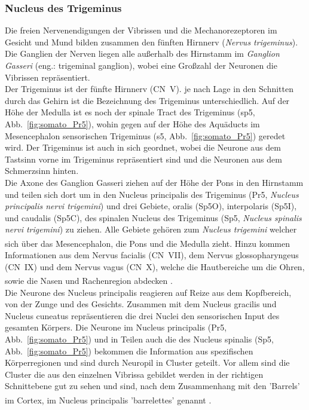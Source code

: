 \documentclass[12pt,a4paper,pdftex]{article}
\begin{document}
\subsubsection*{Nucleus des Trigeminus}
Die freien Nervenendigungen der Vibrissen und die Mechanorezeptoren im Gesicht und Mund bilden zusammen den fünften Hirnnerv (\textit{Nervus trigeminus}). Die Ganglien der Nerven liegen alle außerhalb des Hirnstamm im \textit{Ganglion Gasseri} (eng.: trigeminal ganglion), wobei eine Großzahl der Neuronen die Vibrissen repräsentiert.
\\
\noindent
Der Trigeminus ist der fünfte Hirnnerv (CN~V). je nach Lage in den Schnitten durch das Gehirn ist die Bezeichnung des Trigeminus unterschiedlich. Auf der Höhe der Medulla ist es noch der spinale Tract des Trigeminus (sp5, Abb.~\ref{fig:somato_Pr5}), wohin gegen auf der Höhe des Aquäducts im Mesencephalon sensorischen Trigeminus  (s5, Abb.~\ref{fig:somato_Pr5}) geredet wird. Der Trigeminus ist auch in sich geordnet, wobei die Neurone aus dem Tastsinn vorne im Trigeminus repräsentiert sind und die Neuronen aus dem Schmerzsinn hinten.
\\
\noindent
Die Axone des Ganglion Gasseri ziehen auf der Höhe der Pons in den Hirnstamm und teilen sich dort um in den Nucleus principalis des Trigeminus (Pr5, \textit{Nucleus principalis nervi trigemini})  und drei Gebiete, oralis (Sp5O), interpolaris (Sp5I), und caudalis (Sp5C), des spinalen Nucleus des Trigeminus (Sp5, \textit{Nucleus spinalis nervi trigemini}) zu ziehen. Alle Gebiete gehören zum \textit{Nucleus trigemini} welcher sich über das Mesencephalon, die Pons und die Medulla zieht\textsuperscript{\cite[5]{heldmaier2003tierphysiologie}}. 
Hinzu kommen Informationen aus dem Nervus facialis (CN~VII), dem Nervus glossopharyngeus  (CN~IX) und dem Nervus vagus (CN~X), welche die Hautbereiche um die Ohren, sowie die Nasen und Rachenregion abdecken
\textsuperscript{\cite[12]{neurowissenschaften_baer}}.
\\
\noindent Die Neurone des Nucleus principalis reagieren auf Reize aus dem Kopfbereich, von der Zunge und des Gesichts. Zusammen mit dem Nucleus gracilis und Nucleus cuneatus repräsentieren die drei Nuclei den sensorischen Input des gesamten Körpers. Die Neurone im Nucleus principalis (Pr5, Abb.~\ref{fig:somato_Pr5}) und in Teilen auch die des Nucleus spinalis (Sp5, Abb.~\ref{fig:somato_Pr5}) bekommen die Information aus spezifischen Körperregionen und sind durch Neuropil in Cluster geteilt. Vor allem sind die Cluster die aus den einzelnen Vibrissa gebildet werden in der richtigen Schnittebene gut zu sehen und sind, nach dem Zusammenhang mit den 'Barrels' im Cortex, im Nucleus principalis 'barrelettes' genannt \textsuperscript{\cite[5]{heldmaier2003tierphysiologie}}.
\end{document}

